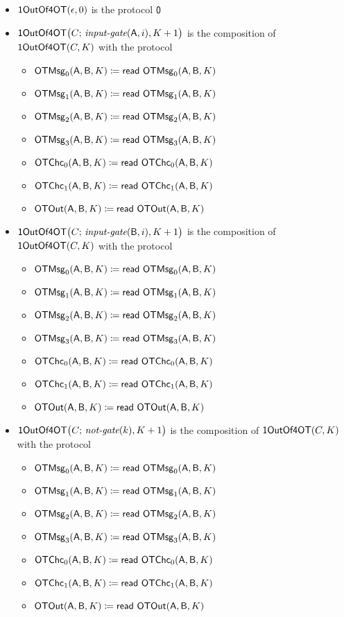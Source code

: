 \begin{itemize}
\item $\OT(\epsilon,0)$ is the protocol $\zero$

\item $\OT\big(C; \, \inputgate(\A,i),K+1\big)$ is the composition of $\OT(C,K)$ with the protocol
\begin{itemize}
\item $\OTMsg_0(\A,\B,K) \coloneqq \read{\OTMsg_0(\A,\B,K)}$
\item $\OTMsg_1(\A,\B,K) \coloneqq \read{\OTMsg_1(\A,\B,K)}$
\item $\OTMsg_2(\A,\B,K) \coloneqq \read{\OTMsg_2(\A,\B,K)}$
\item $\OTMsg_3(\A,\B,K) \coloneqq \read{\OTMsg_3(\A,\B,K)}$\smallskip
\item $\OTChc_0(\A,\B,K) \coloneqq \read{\OTChc_0(\A,\B,K)}$
\item $\OTChc_1(\A,\B,K) \coloneqq \read{\OTChc_1(\A,\B,K)}$\smallskip
\item $\OTOut(\A,\B,K) \coloneqq \read{\OTOut(\A,\B,K)}$
\end{itemize}

\item $\OT\big(C; \, \inputgate(\B,i),K+1\big)$ is the composition of $\OT(C,K)$ with the protocol
\begin{itemize}
\item $\OTMsg_0(\A,\B,K) \coloneqq \read{\OTMsg_0(\A,\B,K)}$
\item $\OTMsg_1(\A,\B,K) \coloneqq \read{\OTMsg_1(\A,\B,K)}$
\item $\OTMsg_2(\A,\B,K) \coloneqq \read{\OTMsg_2(\A,\B,K)}$
\item $\OTMsg_3(\A,\B,K) \coloneqq \read{\OTMsg_3(\A,\B,K)}$\smallskip
\item $\OTChc_0(\A,\B,K) \coloneqq \read{\OTChc_0(\A,\B,K)}$
\item $\OTChc_1(\A,\B,K) \coloneqq \read{\OTChc_1(\A,\B,K)}$\smallskip
\item $\OTOut(\A,\B,K) \coloneqq \read{\OTOut(\A,\B,K)}$
\end{itemize}

\item $\OT\big(C; \, \notgate(k),K+1\big)$ is the composition of $\OT(C,K)$ with the protocol
\begin{itemize}
\item $\OTMsg_0(\A,\B,K) \coloneqq \read{\OTMsg_0(\A,\B,K)}$
\item $\OTMsg_1(\A,\B,K) \coloneqq \read{\OTMsg_1(\A,\B,K)}$
\item $\OTMsg_2(\A,\B,K) \coloneqq \read{\OTMsg_2(\A,\B,K)}$
\item $\OTMsg_3(\A,\B,K) \coloneqq \read{\OTMsg_3(\A,\B,K)}$\smallskip
\item $\OTChc_0(\A,\B,K) \coloneqq \read{\OTChc_0(\A,\B,K)}$
\item $\OTChc_1(\A,\B,K) \coloneqq \read{\OTChc_1(\A,\B,K)}$\smallskip
\item $\OTOut(\A,\B,K) \coloneqq \read{\OTOut(\A,\B,K)}$
\end{itemize}


\end{itemize}
